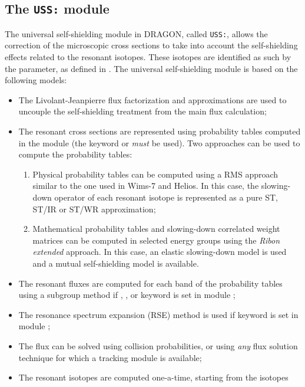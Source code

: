 \subsection{The {\tt USS:} module}\label{sect:USSData}

The universal self-shielding module in DRAGON, called {\tt USS:}, allows the
correction of the microscopic cross sections to take into account the
self-shielding effects related to the resonant isotopes. These isotopes are
identified as such by the 
parameter, as defined in . The universal
self-shielding module is based on the following models:

\begin{itemize}
\item The Livolant-Jeanpierre flux factorization and approximations are used to
uncouple the self-shielding treatment from the main flux calculation;
\item The resonant cross sections are represented using probability
tables computed in the  module (the keyword  or  {\sl must} be
used). Two approaches can be used to compute the probability tables:
\begin{enumerate}
\item Physical probability tables can be computed using a RMS approach similar
to the one used in Wims-7 and Helios.\cite{subg} In this case, the slowing-down operator of
each resonant isotope is represented as a pure ST\cite{st}, ST/IR or ST/WR approximation;
\item Mathematical probability tables\cite{pt} and slowing-down correlated weight matrices
can be computed in selected energy groups using the {\sl Ribon extended} approach.\cite{nse2004} In this case,
an elastic slowing-down model is used and a mutual self-shielding model is
available.
\end{enumerate}
\item The resonant fluxes are computed for each band of the probability tables
using a subgroup method if , ,  or  keyword is set in module ;
\item The resonance spectrum expansion (RSE) method is used if  keyword is set in module ;
\item The flux can be solved using collision probabilities, or using {\sl any}
flux solution technique for which a tracking module is available;
\item The resonant isotopes are computed one-a-time, starting from the isotopes

\end{itemize}

